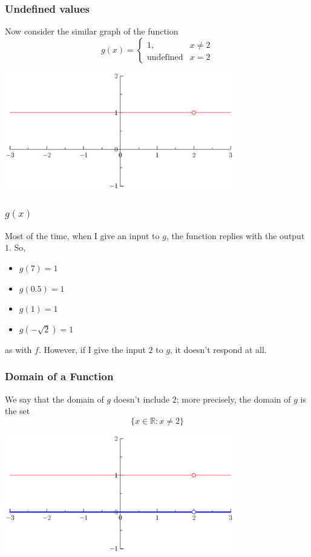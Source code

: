 \documentclass[serif,ignorenonframetext]{beamer}
\begin{document}
\begin{frame}
  \frametitle{Undefined values}
  Now consider the similar graph of the function
  \begin{displaymath}
    g(x)=\begin{cases} 
      1,               & x\ne 2 \\ 
      \mbox{undefined} & x=2
    \end{cases}
  \end{displaymath}
  \begin{center}
    \includegraphics[width=0.75\textwidth]{graph2.eps}
  \end{center}
\end{frame}

\begin{frame}
  \frametitle{$g(x)$}
  Most of the time, when I give an input to $g$, the function replies with
  the output $1$. So,
  \begin{itemize}
  \item $g(7)=1$
  \item $g(0.5)=1$
  \item $g(1)=1$
  \item $g(-\sqrt{2})=1$
  \end{itemize}
  as with $f$.  However, if I give the input $2$ to $g$, it doesn't respond
  at all.
\end{frame}

\begin{frame}
  \frametitle{Domain of a Function}
  We say that the domain of $g$ doesn't include $2$; more precisely, the
  domain of $g$ is the set
  {
  \begin{displaymath}
    \{ x\in \mathbb{R}: x\ne 2\}
  \end{displaymath}
  }
  \begin{center}
    \includegraphics[width=0.75\textwidth]{graph3.eps}
  \end{center}
\end{frame}
\end{document}
